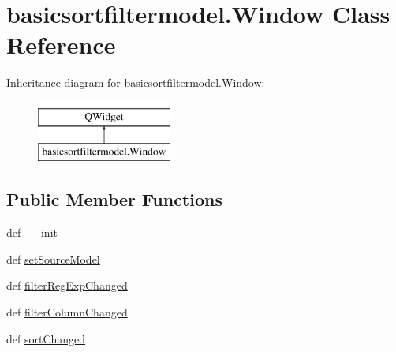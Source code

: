 \hypertarget{classbasicsortfiltermodel_1_1Window}{}\section{basicsortfiltermodel.\+Window Class Reference}
\label{classbasicsortfiltermodel_1_1Window}
Inheritance diagram for basicsortfiltermodel.\+Window\+:\begin{figure}[H]
\begin{center}
\leavevmode
\includegraphics[height=2.000000cm]{classbasicsortfiltermodel_1_1Window}
\end{center}
\end{figure}
\subsection*{Public Member Functions}
\begin{DoxyCompactItemize}
\item 
def \hyperlink{classbasicsortfiltermodel_1_1Window_adf4b43d07c8fed3eae727f27f655ee0a}{\+\_\+\+\_\+init\+\_\+\+\_\+}
\item 
def \hyperlink{classbasicsortfiltermodel_1_1Window_acc6823ce80431994681350cece03c8fd}{set\+Source\+Model}
\item 
def \hyperlink{classbasicsortfiltermodel_1_1Window_ace4509ad805686ee917446321b9b6da2}{filter\+Reg\+Exp\+Changed}
\item 
def \hyperlink{classbasicsortfiltermodel_1_1Window_a939f9f17b52e96e5931a016fddd7db84}{filter\+Column\+Changed}
\item 
def \hyperlink{classbasicsortfiltermodel_1_1Window_adaf0bb01ba4b18f6dcacadf4a6040450}{sort\+Changed}
\end{DoxyCompactItemize}
